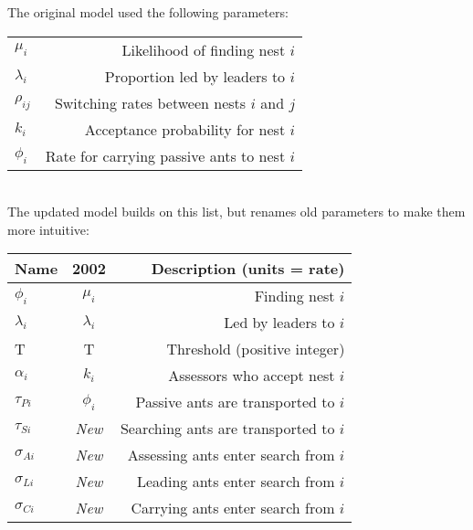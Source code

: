 \documentclass[letterpaper]{article}
\begin{document}
  The original model used the following parameters:\\

\begin{tabular}{ l | r }
    \hline
  $\mu_i$     & Likelihood of finding nest $i$\\
  $\lambda_i$ & Proportion led by leaders to $i$\\
  $\rho_{ij}$ & Switching rates between nests $i$ and $j$\\
  $k_i$       & Acceptance probability for nest $i$\\
  $\phi_i$    & Rate for carrying passive ants to nest $i$\\
    \hline
\end{tabular} \\

The updated model builds on this list, but renames old parameters to make them more intuitive: \\

\begin{tabular}{ l | c | r }
    \hline
  Name          & 2002        & Description (units = rate)\\ \hline
  $\phi_i$      & $\mu_i$     & Finding nest $i$\\
  $\lambda_i$   & $\lambda_i$ & Led by leaders to $i$\\
  T             & T           & Threshold (positive integer)\\
  $\alpha_i$    & $k_i$       & Assessors who accept nest $i$\\ \hline
  $\tau_{Pi}$   & $\phi_i$    & Passive ants are transported to $i$\\
  $\tau_{Si}$   & \em{New}    & Searching ants are transported to $i$\\ \hline
  $\sigma_{Ai}$ & \em{New}    & Assessing ants enter search from $i$\\
  $\sigma_{Li}$ & \em{New}    & Leading ants enter search from $i$\\
  $\sigma_{Ci}$ & \em{New}    & Carrying ants enter search from $i$\\
  \hline
\end{tabular} \\
\end{document}
